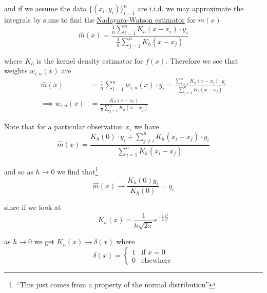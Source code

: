\documentclass[12pt]{article}
\begin{document}
and if we assume the data $\{(x_i,y_i)\}^n_{i=1}$ are i.i.d. we may approximate the integrals by sums to find the \underline{Nadayara-Watson estimator} for $m(x)$
\begin{equation*}
	\hat{m}(x) = \frac{\frac{1}{n}\sum^n_{i=1}K_h(x - x_i)\cdot y_i}{\frac{1}{n}\sum^n_{j=1}K_h(x - x_j)}
\end{equation*}

where $K_h$ is the kernel density estimator for $f(x)$. Therefore we see that weights $w_{i,n}(x)$ are 
\begin{align*}
	\hat{m}(x) &= \frac{1}{n}\sum^n_{i=1} w_{i,n}(x)\cdot y_i =  \frac{\sum^n_{i=1}K_h(x - x_i)\cdot y_i}{\sum^n_{j=1}K_h(x - x_j)}\\
	\implies w_{i,n}(x) &= \frac{K_h(x - x_i)}{\frac{1}{n}\sum^n_{j=1}K_h(x - x_j)}
\end{align*} 

Note that for a particular observation $x_i$ we have
\begin{equation*}
	\hat{m}(x) = \frac{K_h(0)\cdot y_i + \sum^n_{j\neq i}K_h(x_i - x_j)\cdot y_i}{\sum^n_{j=1}K_h(x_i - x_j)}
\end{equation*}

and so as $h\to 0$ we find that\footnote{``This just comes from a property of the normal distribution''}
\begin{equation*}
	\hat{m}(x) \to \frac{K_h(0)y_i}{K_h(0)} = y_i
\end{equation*}

since if we look at
\begin{equation*}
	K_h(x) = \frac{1}{h\sqrt{2\pi}}e^{-\frac{1}{2}\frac{x^2}{h^2}}
\end{equation*}

as $h \to 0$ we get $K_h(x) \to \delta(x)$ where
\begin{equation*}
	\delta(x) =
	\begin{cases}
	1 & \text{if } x = 0 \\
	0 & \text{elsewhere} 
	\end{cases}
\end{equation*}
\end{document}
